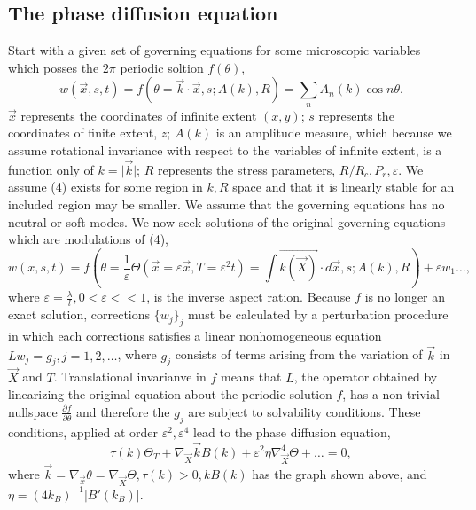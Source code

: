 \documentclass[12pt]{article}
\newcounter{solution}
\begin{document}
\subsection{The phase diffusion equation}
\hspace*{10mm} Start with a given set of governing equations for some microscopic variables which posses the $2\pi$ periodic soltion $f(\theta)$,
\begin{equation}
    w(\vec{x},s,t)=f(\theta=\vec{k}\cdot\vec{x},s;A(k),R) = \sum_n A_n(k)\cos n \theta.
\end{equation}
$\vec{x}$ represents the coordinates of infinite extent $(x,y)$; $s$ represents the coordinates of finite extent, $z$; $A(k)$ is an amplitude measure, which because we assume rotational invariance with respect to the variables of infinite extent, is a function only of $k=\lvert \vec{k} \rvert$; $R$ represents the stress parameters, $R/R_c, P_r, \varepsilon$. We assume (4) exists for some region in $k,R$ space and that it is linearly stable for an included region may be smaller. We assume that the governing equations has no neutral or soft modes. We now seek solutions of the original governing equations which are modulations of (4),
\begin{equation}
    w(x,s,t)=f\left( \theta=\frac{1}{\varepsilon}\Theta(\vec{x}=\varepsilon \vec{x},T=\varepsilon^2 t)=\int \vec{k(\vec{X})}\cdot d\vec{x},s;A(k),R \right)+\varepsilon w_1 \dots,
\end{equation} 
where $\varepsilon = \frac{\lambda}{l}, 0 < \varepsilon << 1$, is the inverse aspect ration. Because $f$ is no longer an exact solution, corrections $\{w_j\}_j$ must be calculated by a perturbation procedure in which each corrections satisfies a linear nonhomogeneous equation $Lw_j = g_j, j=1,2,\dots$, where $g_j$ consists of terms arising from the variation of $\vec{k}$ in $\vec{X}$ and $T$.\newline
\hspace*{10mm} Translational invarianve in $f$ means that $L$, the operator obtained by linearizing the original equation about the periodic solution $f$, has a non-trivial nullspace $\frac{\partial f}{\partial \theta}$ and therefore the $g_j$ are subject to solvability conditions. These conditions, applied at order $\varepsilon^2, \varepsilon^4$ lead to the phase diffusion equation,
\[
    \tau(k)\Theta_T + \nabla_{\vec{X}}\vec{k}B(k) + \varepsilon^2 \eta \nabla_{\vec{X}}^4\Theta + \dots = 0,
\] 
where $\vec{k}=\nabla_{\vec{x}}\theta = \nabla_{\vec{X}}\Theta, \tau(k)>0, kB(k)$ has the graph shown above, and $\eta=(4k_B)^{-1}\lvert B'(k_B) \rvert$.
\end{document}

